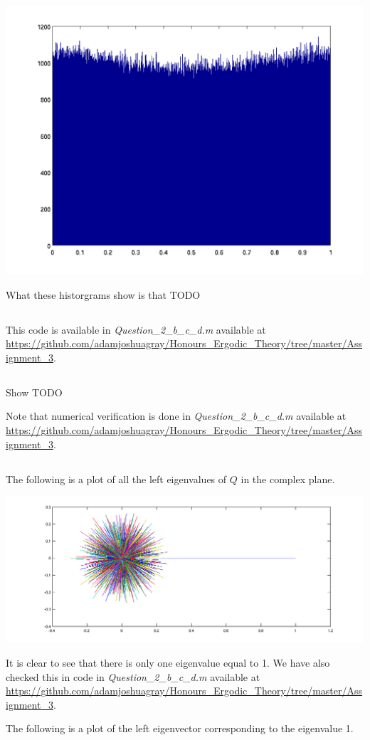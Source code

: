 \documentclass{unswmaths}
\begin{document}
\includegraphics[scale=0.3]{qn_2_a_hist_10}

What these historgrams show is that TODO

\subsection{}
This code is available in \emph{Question\_2\_b\_c\_d.m} available at \url{https://github.com/adamjoshuagray/Honours_Ergodic_Theory/tree/master/Assignment_3}.

\subsection{}
Show TODO

Note that numerical verification is done in  \emph{Question\_2\_b\_c\_d.m} available at \url{https://github.com/adamjoshuagray/Honours_Ergodic_Theory/tree/master/Assignment_3}.

\subsection{}
The following is a plot of all the left eigenvalues of $ Q $ in the complex plane. 


\includegraphics[scale=0.4]{qn_2_eigenvalues}


It is clear to see that there is only one eigenvalue equal to 1. We have also checked this in code in \emph{Question\_2\_b\_c\_d.m} available at \url{https://github.com/adamjoshuagray/Honours_Ergodic_Theory/tree/master/Assignment_3}.

The following is a plot of the left eigenvector corresponding to the eigenvalue 1.
\end{document}
